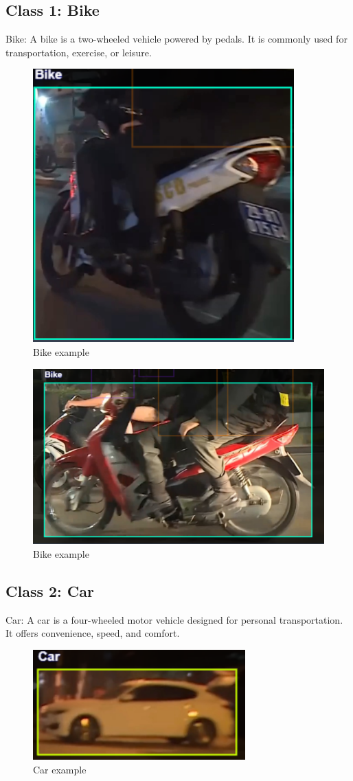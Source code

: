 \documentclass[a4paper,11pt]{article}
\theoremstyle{mytheor}
\begin{document}
\subsection{Class 1: Bike}
Bike: A bike is a two-wheeled vehicle powered by pedals. It is commonly used for transportation, exercise, or leisure. 
\begin{figure}
    \centering
    \includegraphics[width=0.5\linewidth]{bike2.png}
    \caption{Bike example}
    \label{fig:enter-label}
\end{figure}
\begin{figure}
    \centering
    \includegraphics[width=0.5\linewidth]{images/Bike1.png}
    \caption{Bike example}
    \label{fig:enter-label}
\end{figure}
 
\subsection{Class 2: Car}
Car: A car is a four-wheeled motor vehicle designed for personal transportation. It offers convenience, speed, and comfort. 
\begin{figure}
    \centering
    \includegraphics[width=0.5\linewidth]{images/car2.png}
    \caption{Car example}
    \label{fig:enter-label}
\end{figure}
\end{document}
